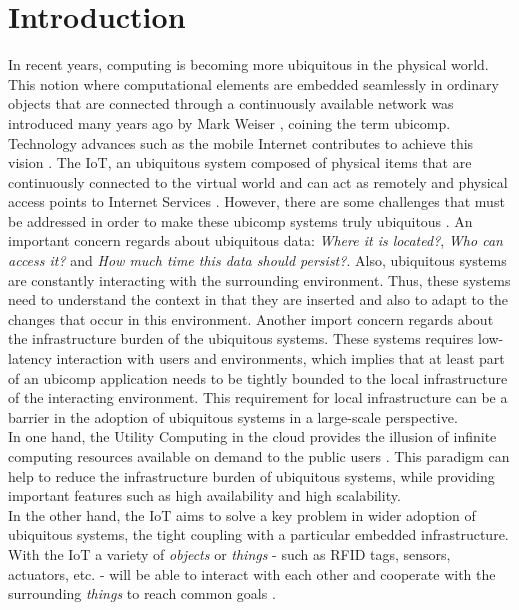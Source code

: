 
\chapter{Introduction}
\label{chapter:introduction}
In recent years, computing is becoming more ubiquitous in the physical world. This notion where
computational elements are embedded seamlessly in ordinary objects that are connected through a
continuously available network was introduced many years ago by Mark Weiser \cite{weiser1991computer},
coining the term \gls{ubicomp}. Technology advances such as the mobile Internet contributes to
achieve this vision \cite{gubbi2013internet}. The \gls{IoT}, an ubiquitous system composed of
physical items that are continuously connected to the virtual world and can act as remotely and
physical access points to Internet Services \cite{mattern2010internet}. However, there are some
challenges that must be addressed in order to make these \gls{ubicomp} systems truly ubiquitous
\cite{caceres2012ubicomp}. An important concern regards about ubiquitous data: \textit{Where it is located?},
\textit{Who can access it?} and \textit{How much time this data should persist?}. Also, ubiquitous systems
are constantly interacting with the surrounding environment. Thus, these systems need to understand
the context in that they are inserted and also to adapt to the changes that occur in this environment.
Another import concern regards about the infrastructure burden of the ubiquitous systems. These
systems requires low-latency interaction with users and environments, which implies that at least part
of an \gls{ubicomp} application needs to be tightly bounded to the local infrastructure of the interacting
environment. This requirement for local infrastructure can be a barrier in the adoption of ubiquitous
systems in a large-scale perspective.\\

In one hand, the Utility Computing in the cloud provides the illusion of infinite computing resources
available on demand to the public users \cite{armbrust2010view}. This paradigm can help to reduce the
infrastructure burden of ubiquitous systems, while providing important features such as high availability
and high scalability.\\

In the other hand, the \gls{IoT} aims to solve a key problem in wider adoption of ubiquitous systems,
the tight coupling with a particular embedded infrastructure. With the \gls{IoT} a variety of
\textit{objects} or \textit{things} - such as \gls{RFID} tags, sensors, actuators, etc. - will be
able to interact with each other and cooperate with the surrounding \textit{things} to reach common
goals \cite{atzori2010internet}.\\

